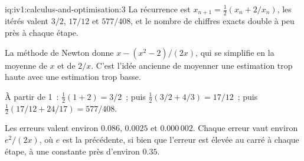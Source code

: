 \begin{solution}{iq:iv1:calculus-and-optimisation:3}
La récurrence est $x_{n+1} = \frac12(x_n + 2/x_n)$, les itérés valent $3/2$, $17/12$ et $577/408$, et le nombre de chiffres exacts double à peu près à chaque étape.

La méthode de Newton donne $x - (x^2 - 2)/(2x)$, qui se simplifie en la moyenne de $x$ et de $2/x$. C'est l'idée ancienne de moyenner une estimation trop haute avec une estimation trop basse.

À partir de 1~: $\frac12(1 + 2) = 3/2$~; puis $\frac12(3/2 + 4/3) = 17/12$~; puis $\frac12(17/12 + 24/17) = 577/408$.

Les erreurs valent environ $0.086$, $0.0025$ et $0.000\,002$. Chaque erreur vaut environ $e^2/(2x)$, où $e$ est la précédente, si bien que l'erreur est élevée au carré à chaque étape, à une constante près d'environ $0.35$.



\end{solution}

